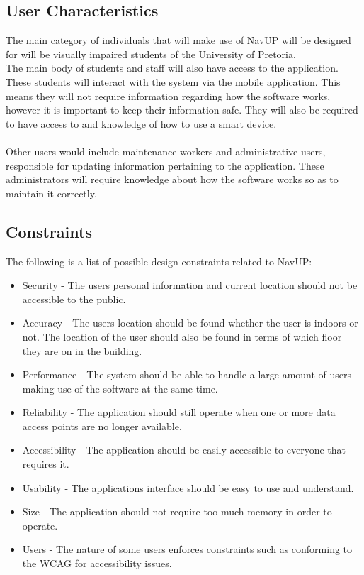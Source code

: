 \documentclass{article}
\begin{document}
	\newpage
	\subsection{User Characteristics}
		The main category of individuals that will make use of NavUP will be designed for will be visually impaired students of the University of Pretoria.\\
		The main body of students and staff will also have access to the application.
		These students will interact with the system via the mobile application. This means they will not require information regarding how the software works, however it is important to keep their information safe. They will also be required to have access to and knowledge of how to use a smart device.\\ \\
		Other users would include maintenance workers and administrative users, responsible for updating information pertaining to the application. These administrators will require knowledge about how the software works so as to maintain it correctly.
	
	
	
	\subsection{Constraints}
		The following is a list of possible design constraints related to NavUP:
		
			\begin{itemize}
				\item Security  - The users personal information and current location should not be accessible to the public.
				\item Accuracy - The users location should be found whether the user is indoors or not. The location of the user should also be found in terms of which floor they are on in the building.
				\item Performance - The system should be able to handle a large amount of users making use of the software at the same time.
				\item Reliability - The application should still operate when one or more data access points are no longer available.
				\item Accessibility - The application should be easily accessible to everyone that requires it.
				\item Usability - The applications interface should be easy to use and understand.
				\item Size - The application should not require too much memory in order to operate.
				\item Users - The nature of some users enforces constraints such as conforming to the WCAG for accessibility issues.
			\end{itemize}
	
\end{document}
